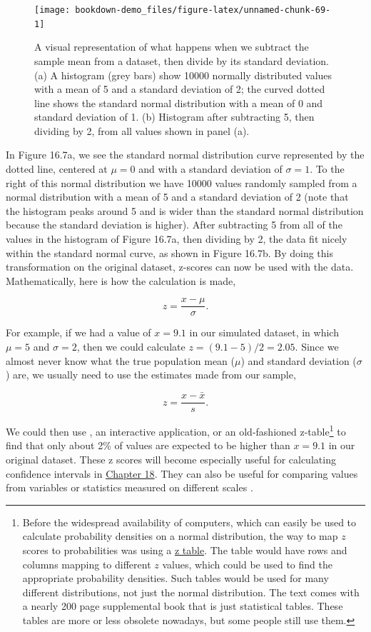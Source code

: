 \documentclass[
]{scrbook}
\begin{document}
\begin{figure}
\texttt{[image: bookdown-demo\_files/figure-latex/unnamed-chunk-69-1]} \caption{A visual representation of what happens when we subtract the sample mean from a dataset, then divide by its standard deviation. (a) A histogram (grey bars) show 10000 normally distributed values with a mean of 5 and a standard deviation of 2; the curved dotted line shows the standard normal distribution with a mean of 0 and standard deviation of 1. (b) Histogram after subtracting 5, then dividing by 2, from all values shown in panel (a).}\label{fig:unnamed-chunk-69}
\end{figure}

In Figure 16.7a, we see the standard normal distribution curve represented by the dotted line, centered at \(\mu = 0\) and with a standard deviation of \(\sigma = 1\).
To the right of this normal distribution we have 10000 values randomly sampled from a normal distribution with a mean of 5 and a standard deviation of 2 (note that the histogram peaks around 5 and is wider than the standard normal distribution because the standard deviation is higher).
After subtracting 5 from all of the values in the histogram of Figure 16.7a, then dividing by 2, the data fit nicely within the standard normal curve, as shown in Figure 16.7b.
By doing this transformation on the original dataset, z-scores can now be used with the data.
Mathematically, here is how the calculation is made,

\[z = \frac{x - \mu}{\sigma}.\]

For example, if we had a value of \(x = 9.1\) in our simulated dataset, in which \(\mu = 5\) and \(\sigma = 2\), then we could calculate \(z = (9.1 - 5) / 2 = 2.05\).
Since we almost never know what the true population mean (\(\mu\)) and standard deviation (\(\sigma\)) are, we usually need to use the estimates made from our sample,

\[z = \frac{x - \bar{x}}{s}.\]

We could then use \citep{Jamovi2022}, an interactive application, or an old-fashioned z-table\footnote{Before the widespread availability of computers, which can easily be used to calculate probability densities on a normal distribution, the way to map \(z\) scores to probabilities was using a \href{https://www.z-table.com/}{z table}. The table would have rows and columns mapping to different \(z\) values, which could be used to find the appropriate probability densities. Such tables would be used for many different distributions, not just the normal distribution. The text \citet{Sokal1995} comes with a nearly 200 page supplemental book that is just statistical tables. These tables are more or less obsolete nowadays, but some people still use them.} to find that only about 2\% of values are expected to be higher than \(x = 9.1\) in our original dataset.
These z scores will become especially useful for calculating confidence intervals in \protect\hyperlink{Chapter_18}{Chapter 18}.
They can also be useful for comparing values from variables or statistics measured on different scales \citep{Sokal1995, Cheadle2003, Adams2016}.
\end{document}
